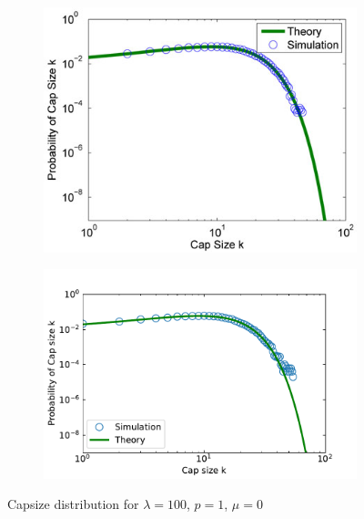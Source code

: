 \documentclass[11pt]{article}
\begin{document}
\begin{figure}[!h]
	\centering
	\begin{subfigure}{\linewidth}
		\centering
		\includegraphics[width=14cm]{plots/4.jpg}
	\end{subfigure}
	\begin{subfigure}{\linewidth}
		\centering
		\includegraphics[width=15cm]{plots/4.pdf}
	\end{subfigure}
	\caption{Capsize distribution for $\lambda=100$, $p=1$, $\mu=0$}
\end{figure}
\end{document}
